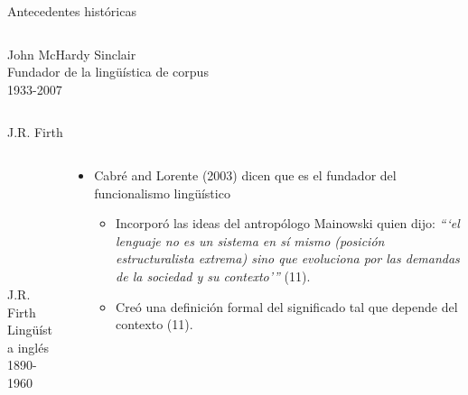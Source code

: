 \documentclass{beamer}
\begin{document}
\begin{frame}{Antecedentes históricas}
\begin{columns}
\begin{column}{6cm}
\begin{flushleft}
\begin{figure}
        	\end{figure}
            \begin{center}
            \tiny
			John McHardy Sinclair \\
			Fundador de la lingüística de corpus \\
			1933-2007\\
            \end{center}
            \end{flushleft}
        \end{column}
    \end{columns}
\end{frame}


\begin{frame}{J.R. Firth}
	\begin{columns}
    	\begin{column}{6cm}
        	\begin{figure}
    		\includegraphics[height=3cm]{firth.png}
       		\end{figure}
            \begin{center}
				\tiny
				J.R. Firth \\
				Lingüísta inglés \\
				1890-1960\\
			\end{center}
        \end{column}
        \begin{column}{6cm}
        	\begin{itemize}
            	\pause
                \item Cabré and Lorente (2003) dicen que es el fundador del funcionalismo lingüístico
                \begin{itemize}
                	\pause
                    \item Incorporó las ideas del antropólogo Mainowski quien dijo: \textit{```el lenguaje no es un sistema en sí mismo (posición estructuralista extrema) sino que evoluciona por las demandas de la sociedad y su contexto'''} (11).
                    \pause
                    \item Creó una definición formal del significado tal que depende del contexto (11).
                \end{itemize}
            \end{itemize}
        \end{column}
    \end{columns}
\end{frame}
\end{document}

